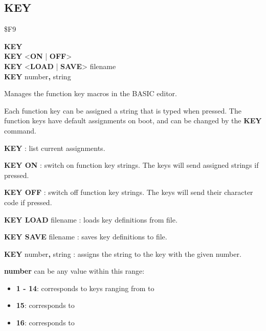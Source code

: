 
\newpage
\subsection{KEY}
\begin{description}[leftmargin=2cm,style=nextline]
\item [Token:] \$F9
\item [Format:] {\bf KEY} \\
		{\bf KEY} <{\bf ON} | {\bf OFF}> \\
		{\bf KEY} <{\bf LOAD} | {\bf SAVE}> filename \\
		{\bf KEY} number{\bf,} string
\item [Usage:] Manages the function key macros in the BASIC editor.

               Each function key can be assigned a string that is typed when
               pressed. The function keys have default assignments on boot,
               and can be changed by the {\bf KEY} command.

               {\bf KEY} : list current assignments.

               {\bf KEY ON} : switch on function key strings.
               The keys will send assigned strings if pressed.

               {\bf KEY OFF} : switch off function key strings.
               The keys will send their character code if pressed.

               {\bf KEY LOAD} filename : loads key definitions from file.

               {\bf KEY SAVE} filename : saves key definitions to file.

               {\bf KEY} number{\bf ,} string : assigns the string to
               the key with the given number.

               {\bf number} can be any value within this range:

                \begin{itemize}
                    \item {\bf 1 - 14}: corresponds to keys ranging from  to 
                    \item {\bf 15}: corresponds to 
                    \item {\bf 16}: corresponds to 
                \end{itemize}


\end{description}
